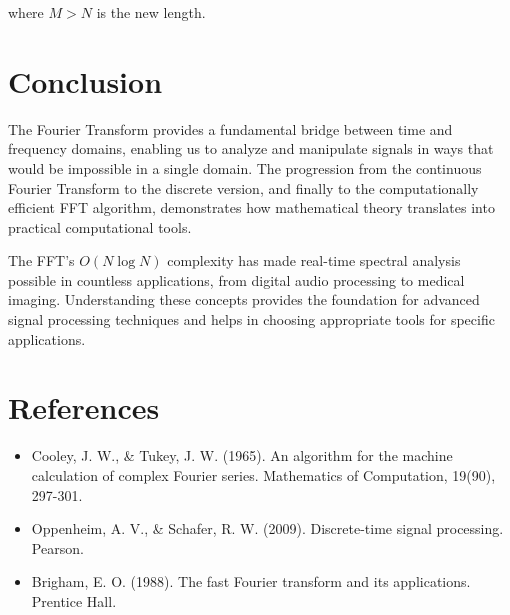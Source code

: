\documentclass[11pt,a4paper]{article}
\begin{document}
where $M > N$ is the new length.

\section{Conclusion}

The Fourier Transform provides a fundamental bridge between time and frequency domains, enabling us to analyze and manipulate signals in ways that would be impossible in a single domain. The progression from the continuous Fourier Transform to the discrete version, and finally to the computationally efficient FFT algorithm, demonstrates how mathematical theory translates into practical computational tools.

The FFT's $O(N \log N)$ complexity has made real-time spectral analysis possible in countless applications, from digital audio processing to medical imaging. Understanding these concepts provides the foundation for advanced signal processing techniques and helps in choosing appropriate tools for specific applications.

\section{References}

\begin{itemize}
    \item Cooley, J. W., \& Tukey, J. W. (1965). An algorithm for the machine calculation of complex Fourier series. Mathematics of Computation, 19(90), 297-301.
    \item Oppenheim, A. V., \& Schafer, R. W. (2009). Discrete-time signal processing. Pearson.
    \item Brigham, E. O. (1988). The fast Fourier transform and its applications. Prentice Hall.
\end{itemize}
\end{document}
